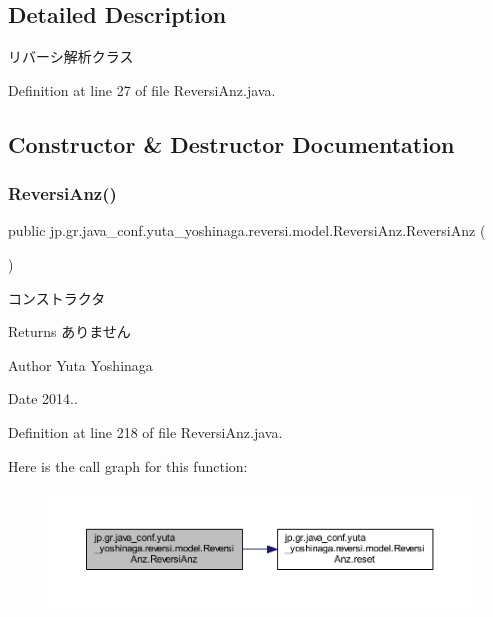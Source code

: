 \subsection{Detailed Description}
リバーシ解析クラス 

Definition at line 27 of file Reversi\+Anz.\+java.



\subsection{Constructor \& Destructor Documentation}
\mbox{\label{classjp_1_1gr_1_1java__conf_1_1yuta__yoshinaga_1_1reversi_1_1model_1_1_reversi_anz_a130d4d7b3641a385209d1596c2f3e024}} 
\subsubsection{\texorpdfstring{Reversi\+Anz()}{ReversiAnz()}}
{\footnotesize\ttfamily public jp.\+gr.\+java\+\_\+conf.\+yuta\+\_\+yoshinaga.\+reversi.\+model.\+Reversi\+Anz.\+Reversi\+Anz (\begin{DoxyParamCaption}{ }\end{DoxyParamCaption})}



コンストラクタ 

\begin{DoxyReturn}{Returns}
ありません 
\end{DoxyReturn}
\begin{DoxyAuthor}{Author}
Yuta Yoshinaga 
\end{DoxyAuthor}
\begin{DoxyDate}{Date}
2014.. 
\end{DoxyDate}


Definition at line 218 of file Reversi\+Anz.\+java.

Here is the call graph for this function\+:\nopagebreak
\begin{figure}[H]
\begin{center}
\leavevmode
\includegraphics[width=350pt]{classjp_1_1gr_1_1java__conf_1_1yuta__yoshinaga_1_1reversi_1_1model_1_1_reversi_anz_a130d4d7b3641a385209d1596c2f3e024_cgraph}
\end{center}
\end{figure}



